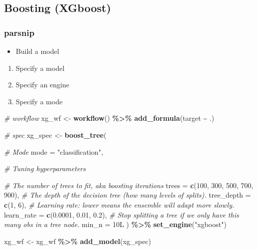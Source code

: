\documentclass[
]{book}
\newenvironment{Shaded}{\begin{snugshade}}{\end{snugshade}}
\newcommand{\CommentTok}[1]{\textcolor[rgb]{0.56,0.35,0.01}{\textit{#1}}}
\newcommand{\DataTypeTok}[1]{\textcolor[rgb]{0.13,0.29,0.53}{#1}}
\newcommand{\DecValTok}[1]{\textcolor[rgb]{0.00,0.00,0.81}{#1}}
\newcommand{\FloatTok}[1]{\textcolor[rgb]{0.00,0.00,0.81}{#1}}
\newcommand{\KeywordTok}[1]{\textcolor[rgb]{0.13,0.29,0.53}{\textbf{#1}}}
\newcommand{\NormalTok}[1]{#1}
\newcommand{\OperatorTok}[1]{\textcolor[rgb]{0.81,0.36,0.00}{\textbf{#1}}}
\newcommand{\StringTok}[1]{\textcolor[rgb]{0.31,0.60,0.02}{#1}}
\providecommand{\tightlist}{%
  \setlength{\itemsep}{0pt}\setlength{\parskip}{0pt}}
\begin{document}
\hypertarget{boosting-xgboost}{%
\subsection{Boosting (XGboost)}\label{boosting-xgboost}}

\hypertarget{parsnip-3}{%
\subsubsection{parsnip}\label{parsnip-3}}

\begin{itemize}
\tightlist
\item
  Build a model
\end{itemize}

\begin{enumerate}
\def\labelenumi{\arabic{enumi}.}
\tightlist
\item
  Specify a model
\item
  Specify an engine
\item
  Specify a mode
\end{enumerate}

\begin{Shaded}
\begin{Highlighting}[]
\CommentTok{\# workflow}
\NormalTok{xg\_wf \textless{}{-}}\StringTok{ }\KeywordTok{workflow}\NormalTok{() }\OperatorTok{\%\textgreater{}\%}\StringTok{ }\KeywordTok{add\_formula}\NormalTok{(target }\OperatorTok{\textasciitilde{}}\StringTok{ }\NormalTok{.)}

\CommentTok{\# spec}
\NormalTok{xg\_spec \textless{}{-}}\StringTok{ }\KeywordTok{boost\_tree}\NormalTok{(}

  \CommentTok{\# Mode}
  \DataTypeTok{mode =} \StringTok{"classification"}\NormalTok{,}

  \CommentTok{\# Tuning hyperparameters}

  \CommentTok{\# The number of trees to fit, aka boosting iterations}
  \DataTypeTok{trees =} \KeywordTok{c}\NormalTok{(}\DecValTok{100}\NormalTok{, }\DecValTok{300}\NormalTok{, }\DecValTok{500}\NormalTok{, }\DecValTok{700}\NormalTok{, }\DecValTok{900}\NormalTok{),}
  \CommentTok{\# The depth of the decision tree (how many levels of splits).}
  \DataTypeTok{tree\_depth =} \KeywordTok{c}\NormalTok{(}\DecValTok{1}\NormalTok{, }\DecValTok{6}\NormalTok{),}
  \CommentTok{\# Learning rate: lower means the ensemble will adapt more slowly.}
  \DataTypeTok{learn\_rate =} \KeywordTok{c}\NormalTok{(}\FloatTok{0.0001}\NormalTok{, }\FloatTok{0.01}\NormalTok{, }\FloatTok{0.2}\NormalTok{),}
  \CommentTok{\# Stop splitting a tree if we only have this many obs in a tree node.}
  \DataTypeTok{min\_n =}\NormalTok{ 10L}
\NormalTok{) }\OperatorTok{\%\textgreater{}\%}
\StringTok{  }\KeywordTok{set\_engine}\NormalTok{(}\StringTok{"xgboost"}\NormalTok{)}

\NormalTok{xg\_wf \textless{}{-}}\StringTok{ }\NormalTok{xg\_wf }\OperatorTok{\%\textgreater{}\%}\StringTok{ }\KeywordTok{add\_model}\NormalTok{(xg\_spec)}
\end{Highlighting}
\end{Shaded}
\end{document}
